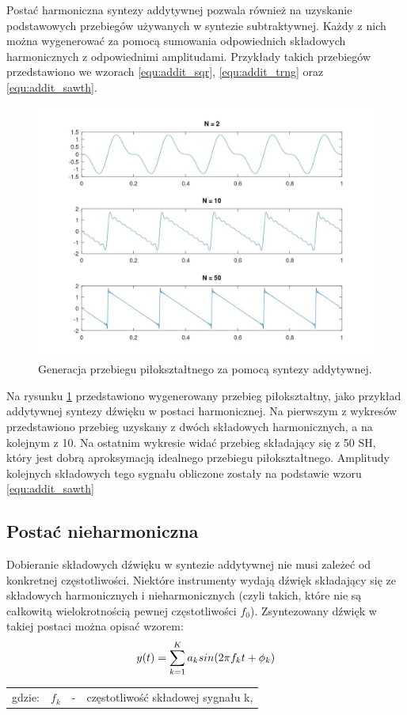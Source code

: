 Postać harmoniczna syntezy addytywnej pozwala również na uzyskanie podstawowych przebiegów używanych w syntezie subtraktywnej. Każdy z nich można wygenerować za pomocą sumowania odpowiednich składowych harmonicznych z odpowiednimi amplitudami. Przykłady takich przebiegów przedstawiono we wzorach \ref{equ:addit_sqr}, \ref{equ:addit_trng} oraz \ref{equ:addit_sawth}.

\begin{figure}[H]
	\centering
	\includegraphics[width=12cm]{grafiki/add_sawtooth}
	\captionsetup{justification=centering}
	\caption{Generacja przebiegu piłokształtnego za pomocą syntezy addytywnej.}
	\label{rys:add_sawtooth}
\end{figure}

Na rysunku \ref{rys:add_sawtooth} przedstawiono wygenerowany przebieg piłokształtny, jako przykład addytywnej syntezy dźwięku w postaci harmonicznej. Na pierwszym z wykresów przedstawiono przebieg uzyskany z dwóch składowych harmonicznych, a na kolejnym z 10. Na ostatnim wykresie widać przebieg składający się z 50 SH, który jest dobrą aproksymacją idealnego przebiegu piłokształtnego. Amplitudy kolejnych składowych tego sygnału obliczone zostały na podstawie wzoru \ref{equ:addit_sawth}

\subsection{Postać nieharmoniczna} \label{pos_nieharm}
Dobieranie składowych dźwięku w syntezie addytywnej nie musi zależeć od konkretnej częstotliwości. Niektóre instrumenty wydają dźwięk składający się ze składowych harmonicznych i nieharmonicznych (czyli takich, które nie są całkowitą wielokrotnością pewnej częstotliwości $f_{0}$). Zsyntezowany dźwięk w takiej postaci można opisać wzorem:
\begin{equation} \label{equ:addit_time_nieharm}
y(t) = \sum_{k=1}^{K} a_{k}sin(2\pi f_{k}t + \phi_{k})  \\  
\end{equation}
\begin{tabular}{ l l l l}
	gdzie: 	&	$f_{k}$ & - &  częstotliwość składowej sygnału k,\\
\end{tabular}

